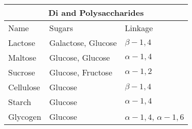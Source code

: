 \documentclass{article}
\begin{document}
\begin{tabular}{ |p{3cm}|p{3cm}|p{3cm}|  }
\hline
\multicolumn{3}{|c|}{Di and Polysaccharides} \\
\hline
Name & Sugars & Linkage \\
\hline
Lactose & Galactose, Glucose	 & $\beta-1,4$ \\
Maltose & Glucose, Glucose   & $\alpha-1,4$ \\
Sucrose & Glucose, Fructose & $\alpha-1,2$ \\
Cellulose    & Glucose &  $\beta-1,4$ \\
Starch & Glucose & $\alpha-1,4$ \\
Glycogen & Glucose & $\alpha-1,4$, $\alpha-1,6$   \\
\hline
\end{tabular}
\end{document}
